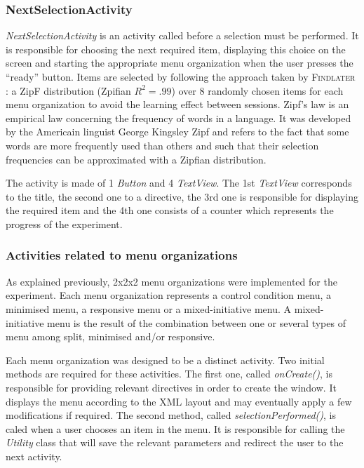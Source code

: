 \subsubsection{NextSelectionActivity}
\textit{NextSelectionActivity} is an activity called before a selection must 
be performed. It is responsible for choosing the next required item, 
displaying this choice on the screen and starting the appropriate menu 
organization when the user presses the \enquote{ready} button. Items are 
selected by following the approach taken by \textsc{Findlater} \cite{findlater} 
: a ZipF 
distribution (Zpifian $R^2=.99$) over 8 randomly chosen items for each menu 
organization to avoid the learning effect between sessions. Zipf's law is an 
empirical law concerning the frequency of words in a language. It was developed 
by the Americain linguist George Kingsley Zipf and refers to the fact that some 
words are more frequently used than others and such that their selection 
frequencies can be approximated with a Zipfian distribution.\newline

The activity is made of 1 \textit{Button} and 4 \textit{TextView}. The 1st 
\textit{TextView} corresponds to the title, the second one to a directive, the 
3rd one is responsible for displaying the required item and the 4th one
consists of a counter which represents the progress of the experiment.

\subsubsection{Activities related to menu organizations}
As explained previously, 2x2x2 menu organizations were implemented for the 
experiment. Each menu organization represents a control condition menu, a 
minimised menu, a responsive menu or a mixed-initiative menu. A 
mixed-initiative menu is the result of the combination between one or several 
types of menu among split, minimised and/or responsive.\newline

Each menu organization was designed to be a distinct activity. Two initial 
methods are required for these activities. The first one, called 
\textit{onCreate()}, is responsible for providing relevant directives in 
order to create the window. It displays the menu according to the XML layout 
and may eventually apply a few modifications if required. The second 
method, called \textit{selectionPerformed()}, is caled when a user chooses an 
item in the menu. It is responsible for calling the \textit{Utility} class 
that will save the relevant parameters and redirect the user to the next 
activity.\newline

